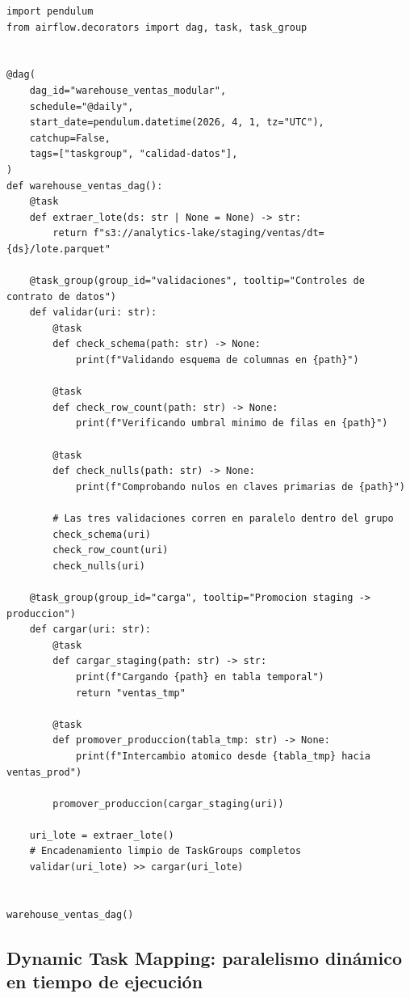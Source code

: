 \begin{lstlisting}[style=python, caption={Modularización de un pipeline de calidad y carga mediante \code{@task\_group}.}, label={lst:taskgroups}]
import pendulum
from airflow.decorators import dag, task, task_group


@dag(
    dag_id="warehouse_ventas_modular",
    schedule="@daily",
    start_date=pendulum.datetime(2026, 4, 1, tz="UTC"),
    catchup=False,
    tags=["taskgroup", "calidad-datos"],
)
def warehouse_ventas_dag():
    @task
    def extraer_lote(ds: str | None = None) -> str:
        return f"s3://analytics-lake/staging/ventas/dt={ds}/lote.parquet"

    @task_group(group_id="validaciones", tooltip="Controles de contrato de datos")
    def validar(uri: str):
        @task
        def check_schema(path: str) -> None:
            print(f"Validando esquema de columnas en {path}")

        @task
        def check_row_count(path: str) -> None:
            print(f"Verificando umbral minimo de filas en {path}")

        @task
        def check_nulls(path: str) -> None:
            print(f"Comprobando nulos en claves primarias de {path}")

        # Las tres validaciones corren en paralelo dentro del grupo
        check_schema(uri)
        check_row_count(uri)
        check_nulls(uri)

    @task_group(group_id="carga", tooltip="Promocion staging -> produccion")
    def cargar(uri: str):
        @task
        def cargar_staging(path: str) -> str:
            print(f"Cargando {path} en tabla temporal")
            return "ventas_tmp"

        @task
        def promover_produccion(tabla_tmp: str) -> None:
            print(f"Intercambio atomico desde {tabla_tmp} hacia ventas_prod")

        promover_produccion(cargar_staging(uri))

    uri_lote = extraer_lote()
    # Encadenamiento limpio de TaskGroups completos
    validar(uri_lote) >> cargar(uri_lote)


warehouse_ventas_dag()
\end{lstlisting}

\subsection{Dynamic Task Mapping: paralelismo dinámico en tiempo de ejecución}

